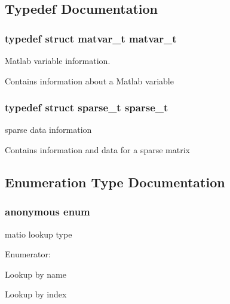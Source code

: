 \subsection{Typedef Documentation}
\hypertarget{group__MAT_ga24775c96a2a6d073581639c780b7896c}{
\subsubsection[{matvar\_\-t}]{\setlength{\rightskip}{0pt plus 5cm}typedef struct {\bf matvar\_\-t}  {\bf matvar\_\-t}}}
\label{group__MAT_ga24775c96a2a6d073581639c780b7896c}


Matlab variable information. 

Contains information about a Matlab variable \hypertarget{group__MAT_ga3ce6ed53a1909e27e92f3eaffc2f92ed}{
\subsubsection[{sparse\_\-t}]{\setlength{\rightskip}{0pt plus 5cm}typedef struct {\bf sparse\_\-t}  {\bf sparse\_\-t}}}
\label{group__MAT_ga3ce6ed53a1909e27e92f3eaffc2f92ed}


sparse data information 

Contains information and data for a sparse matrix 

\subsection{Enumeration Type Documentation}
\hypertarget{group__MAT_ga06fc87d81c62e9abb8790b6e5713c55b}{
\subsubsection[{"@0}]{\setlength{\rightskip}{0pt plus 5cm}anonymous enum}}
\label{group__MAT_ga06fc87d81c62e9abb8790b6e5713c55b}
matio lookup type \begin{Desc}
\item[Enumerator: ]\par
\begin{description}
\item[{\em 
\hypertarget{group__MAT_gga06fc87d81c62e9abb8790b6e5713c55ba8938378c70879fe916177141cce0417e}{
BY\_\-NAME}
\label{group__MAT_gga06fc87d81c62e9abb8790b6e5713c55ba8938378c70879fe916177141cce0417e}
}]Lookup by name \item[{\em 
\hypertarget{group__MAT_gga06fc87d81c62e9abb8790b6e5713c55ba5f4d5606de1ec27f80f4a50186909005}{
BY\_\-INDEX}
\label{group__MAT_gga06fc87d81c62e9abb8790b6e5713c55ba5f4d5606de1ec27f80f4a50186909005}
}]Lookup by index \end{description}
\end{Desc}

